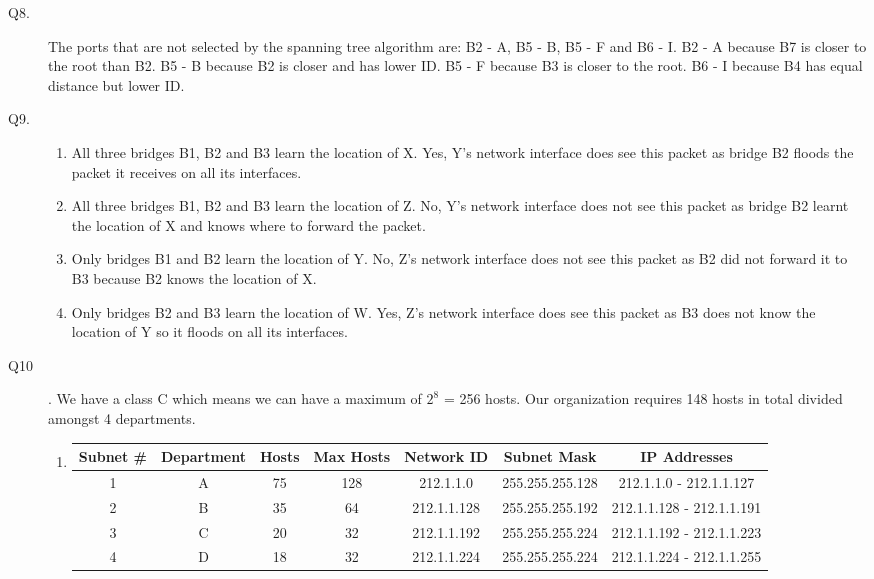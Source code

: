 \documentclass{csc_assignment}
\begin{document}
\begin{description}
\item[Q8.]
The ports that are not selected by the spanning tree algorithm are: B2 - A, B5 - B, B5 - F and B6 - I. B2 - A because B7 is closer to the root than B2. B5 - B because B2 is closer and has lower ID. B5 - F because B3 is closer to the root. B6 - I because B4 has equal distance but lower ID.


\item[Q9.]
\begin{enumerate}
\item All three bridges B1, B2 and B3 learn the location of X. Yes, Y's network interface does see this packet as bridge B2 floods the packet it receives on all its interfaces. 
\item All three bridges B1, B2 and B3 learn the location of Z. No, Y's network interface does not see this packet as bridge B2 learnt the location of X and knows where to forward the packet.
\item Only bridges B1 and B2 learn the location of Y. No, Z's network interface does not see this packet as B2 did not forward it to B3 because B2 knows the location of X.
\item Only bridges B2 and B3 learn the location of W. Yes, Z's network interface does see this packet as B3 does not know the location of Y so it floods on all its interfaces. 
\end{enumerate}


\item[Q10].
We have a class C which means we can have a maximum of $2^{8}$ = 256 hosts. Our organization requires 148 hosts in total divided amongst 4 departments. 
\begin{enumerate}
\item
\begin{tabular}{ |c|c|c|c|c|c|c| }
\hline
	Subnet \# & Department & Hosts & Max Hosts & Network ID & Subnet Mask & IP Addresses \\
	\hline
	1 & A & 75 & 128 & 212.1.1.0 & 255.255.255.128 & 212.1.1.0 - 212.1.1.127 \\
	\hline
	2 & B & 35 & 64 & 212.1.1.128 & 255.255.255.192 & 212.1.1.128 - 212.1.1.191 \\
	\hline
	3 & C & 20 & 32 & 212.1.1.192 & 255.255.255.224 & 212.1.1.192 - 212.1.1.223 \\
	\hline
	4 & D & 18 & 32 & 212.1.1.224 & 255.255.255.224 & 212.1.1.224 - 212.1.1.255 \\
	\hline
\end{tabular} \\


\end{enumerate}
\end{description}
\end{document}
